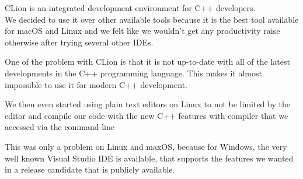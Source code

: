 CLion is an integrated development environment for C++ developers. \cite{clion} \\
We decided to use it over other available tools because it is the best tool available for macOS and Linux and we felt like we wouldn't get any productivity raise otherwise after trying several other IDEs.

One of the problem with CLion is that it is not up-to-date with all of the latest developments in the C++ programming language. This makes it almost impossible to use it for modern C++ development. 

We then even started using plain text editors on Linux to not be limited by the editor and compile our code with the new C++ features with compiler that we accessed via the command-line
\cite{clionstatus}

This was only a problem on Linux and maxOS, because for Windows, the very well known Visual Studio IDE is available, that supports the features we wanted in a release candidate that is publicly available.
